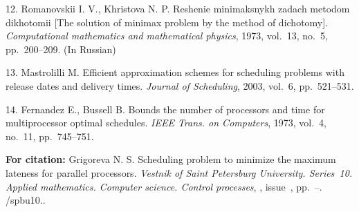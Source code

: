 {12. Romanovskii I. V., Khristova N. P. Reshenie minimaksnykh
zadach metodom dikhotomii [The solution of minimax problem by the
method of dichotomy]. {\it Computational   mathematics and
mathematical physics}, 1973, vol.~13, no.~5, pp.~200--209. (In
Russian)\newpage

13. Mastrolilli M. Efficient approximation schemes for scheduling
problems with release dates and delivery times. {\it Journal of
Scheduling}, 2003, vol.~6, pp.~521--531.


14. Fernandez E., Bussell B. Bounds the number of processors and
time for multiprocessor optimal schedules. {\it IEEE Trans. on
Computers}, 1973, vol.~4, no.~11, pp.~745--751.


\vskip 2mm

{\bf For citation:}  Grigoreva N. S. Scheduling problem to
minimize the maximum lateness  for parallel processors. {\it
Vestnik of Saint Petersburg University. Series~10. Applied
mathematics. Computer science. Control processes}, \issueyear,
issue~\issuenum, pp.~\pageref{p5}--\pageref{p5e}.
\doivyp/spbu10.\issueyear.


}
